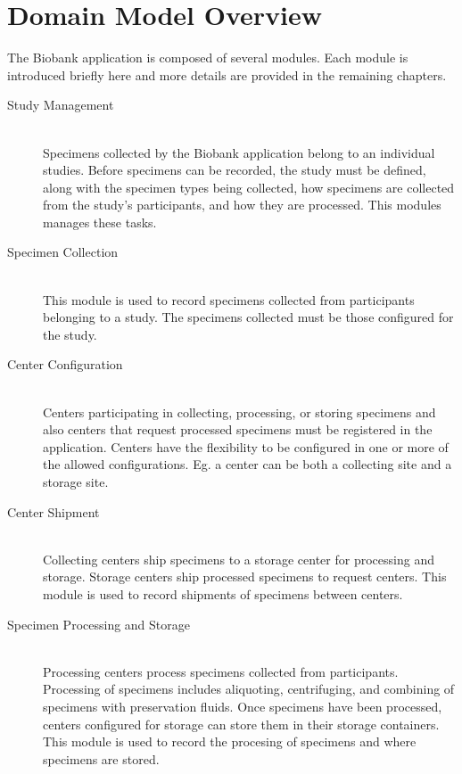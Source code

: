 \chapter{Domain Model Overview}

The Biobank application is composed of several modules. Each module is
introduced briefly here and more details are provided in the remaining
chapters.

\begin{description}

  \item[Study Management] \hfill \\ Specimens collected by the Biobank
    application belong to an individual studies. Before specimens can be
    recorded, the study must be defined, along with the specimen types being
    collected, how specimens are collected from the study's participants, and
    how they are processed. This modules manages these tasks.

  \item[Specimen Collection] \hfill \\ This module is used to record
    specimens collected from participants belonging to a study. The specimens
    collected must be those configured for the study.

  \item[Center Configuration] \hfill \\ Centers participating in collecting,
    processing, or storing specimens and also centers that request processed
    specimens must be registered in the application. Centers have the
    flexibility to be configured in one or more of the allowed
    configurations. Eg. a center can be both a collecting site and a storage
    site.

  \item[Center Shipment] \hfill \\ Collecting centers ship specimens to a
    storage center for processing and storage. Storage centers ship processed
    specimens to request centers. This module is used to record shipments of
    specimens between centers.

  \item[Specimen Processing and Storage] \hfill \\ Processing centers process
    specimens collected from participants. Processing of specimens includes
    aliquoting, centrifuging, and combining of specimens with preservation
    fluids.  Once specimens have been processed, centers configured for storage
    can store them in their storage containers. This module is used to record
    the procesing of specimens and where specimens are stored.


\end{description}
